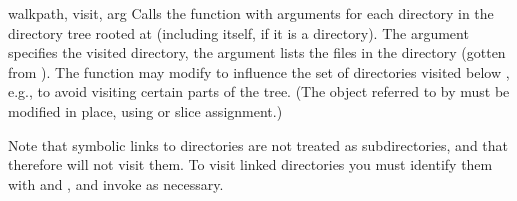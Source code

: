 \begin{funcdesc}{walk}{path, visit, arg}
Calls the function  with arguments
 for each directory in the
directory tree rooted at  (including  itself, if it
is a directory).  The argument  specifies the visited
directory, the argument  lists the files in the directory
(gotten from ).
The  function may modify  to
influence the set of directories visited below , e.g., to
avoid visiting certain parts of the tree.  (The object referred to by
 must be modified in place, using  or slice
assignment.)

Note that symbolic links to directories are not treated as subdirectories,
and that  therefore will not visit them. To visit linked
directories you must identify them with  and
, and invoke  as necessary.
\end{funcdesc}
